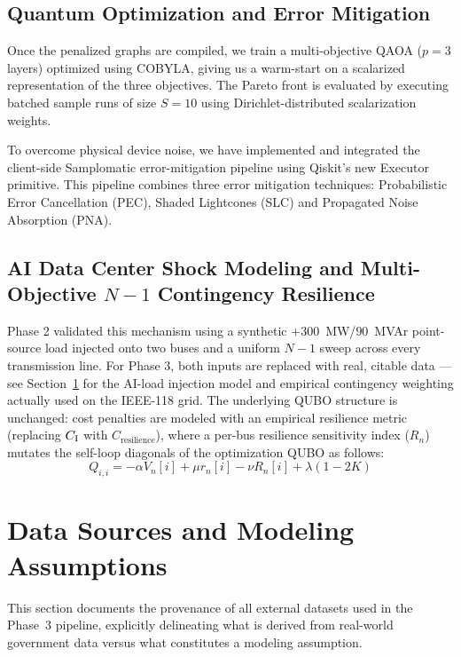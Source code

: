 \documentclass[11pt]{article}
\begin{document}
\subsection{Quantum Optimization and Error Mitigation}
Once the penalized graphs are compiled, we train a multi-objective QAOA ($p=3$ layers) optimized using COBYLA, giving us a warm-start on a scalarized representation of the three objectives. The Pareto front is evaluated by executing batched sample runs of size $S=10$ using Dirichlet-distributed scalarization weights.

To overcome physical device noise, we have implemented and integrated the client-side Samplomatic error-mitigation pipeline using Qiskit's new Executor primitive. This pipeline combines three error mitigation techniques: Probabilistic Error Cancellation (PEC), Shaded Lightcones (SLC) and Propagated Noise Absorption (PNA).

\subsection{\texorpdfstring{AI Data Center Shock Modeling and Multi-Objective $N-1$ Contingency Resilience}{AI Data Center Shock Modeling and Multi-Objective N-1 Contingency Resilience}}
Phase 2 validated this mechanism using a synthetic $+300$~MW/$90$~MVAr point-source load injected onto two buses and a uniform $N-1$ sweep across every transmission line. For Phase 3, both inputs are replaced with real, citable data --- see Section~\ref{sec:data-sources} for the AI-load injection model and empirical contingency weighting actually used on the IEEE-118 grid. The underlying QUBO structure is unchanged: cost penalties are modeled with an empirical resilience metric (replacing $C_{\rm I}$ with $C_{\text{resilience}}$), where a per-bus resilience sensitivity index ($R_n$) mutates the self-loop diagonals of the optimization QUBO as follows:
$$Q_{i,i} = -\alpha V_n[i] + \mu r_n[i] - \nu R_n[i] + \lambda(1 - 2K)$$

\section{Data Sources and Modeling Assumptions}
\label{sec:data-sources}
This section documents the provenance of all external datasets used in the Phase~3 pipeline, explicitly delineating what is derived from real-world government data versus what constitutes a modeling assumption.
\end{document}
